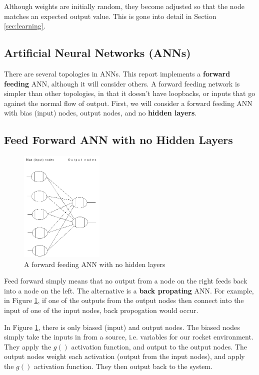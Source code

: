 \documentclass[12pt]{article}
\begin{document}
Although weights are initially random, they become adjusted so that the node matches an expected output
value. This is gone into detail in Section \ref{sec:learning}.

\subsection{Artificial Neural Networks (ANNs)}
There are several topologies in ANNs. This report implements a \textbf{forward feeding} ANN, although it 
will consider others. A forward feeding network is simpler than other topologies, in that it doesn't have
loopbacks, or inputs that go against the normal flow of output. First, we will consider a forward feeding ANN
with bias (input) nodes, output nodes, and no \textbf{hidden layers}.

\subsection{Feed Forward ANN with no Hidden Layers}

\begin{figure}[h]
        \begin{center}
		\includegraphics[width=40mm]{report_images/feedforward01.png}
                	\caption{A forward feeding ANN with no hidden layers}
                	\label{feedforward01}
        \end{center}
\end{figure}

Feed forward simply means that no output from a node on the right feeds back into a node on the left. The 
alternative is a \textbf{back propating} ANN. For example, in Figure \ref{feedforward01}, if one of the outputs
from the output nodes then connect into the input of one of the input nodes, back propogation would occur.

In Figure \ref{feedforward01}, there is only biased (input) and output nodes. The biased nodes simply take
the inputs in from a source, i.e. variables for our rocket environment. They apply the $ g() $ activation 
function, and output to the output nodes. The output nodes weight each activation (output from the input
nodes), and apply the $ g() $ activation function. They then output back to the system.
\end{document}
